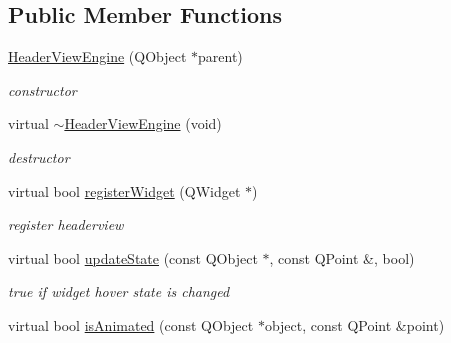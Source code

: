 \subsection*{Public Member Functions}
\begin{DoxyCompactItemize}
\item 
\mbox{\label{class_header_view_engine_ac2f592062758535162629d4eda35edb9}} 
\hyperlink{class_header_view_engine_ac2f592062758535162629d4eda35edb9}{Header\+View\+Engine} (Q\+Object $\ast$parent)
\begin{DoxyCompactList}\small\item\em constructor \end{DoxyCompactList}\item 
\mbox{\label{class_header_view_engine_a38af0b2b87cc4f1df074f7b54b739142}} 
virtual \hyperlink{class_header_view_engine_a38af0b2b87cc4f1df074f7b54b739142}{$\sim$\+Header\+View\+Engine} (void)
\begin{DoxyCompactList}\small\item\em destructor \end{DoxyCompactList}\item 
\mbox{\label{class_header_view_engine_a656468c4051262c7e72ad8bc0cfefbe4}} 
virtual bool \hyperlink{class_header_view_engine_a656468c4051262c7e72ad8bc0cfefbe4}{register\+Widget} (Q\+Widget $\ast$)
\begin{DoxyCompactList}\small\item\em register headerview \end{DoxyCompactList}\item 
\mbox{\label{class_header_view_engine_a9ff1ab3365f5d1db3709363ea943784e}} 
virtual bool \hyperlink{class_header_view_engine_a9ff1ab3365f5d1db3709363ea943784e}{update\+State} (const Q\+Object $\ast$, const Q\+Point \&, bool)
\begin{DoxyCompactList}\small\item\em true if widget hover state is changed \end{DoxyCompactList}\item 
\mbox{\label{class_header_view_engine_ac296396ce68cfb9d8ba6a11f952a10b0}} 
virtual bool \hyperlink{class_header_view_engine_ac296396ce68cfb9d8ba6a11f952a10b0}{is\+Animated} (const Q\+Object $\ast$object, const Q\+Point \&point)

\end{DoxyCompactItemize}
